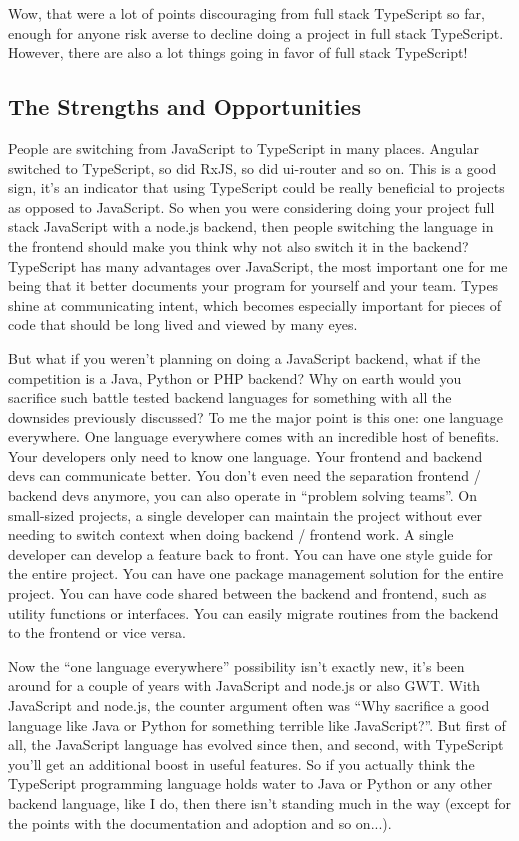 \documentclass[12pt,a4paper]{report}
\begin{document}
Wow, that were a lot of points discouraging from full stack TypeScript so far, enough for anyone risk averse to decline doing a project in full stack TypeScript. However, there are also a lot things going in favor of full stack TypeScript!

\subsection{The Strengths and Opportunities}
People are switching from JavaScript to TypeScript in many places. Angular switched to TypeScript, so did RxJS, so did ui-router and so on. This is a good sign, it's an indicator that using TypeScript could be really beneficial to projects as opposed to JavaScript. So when you were considering doing your project full stack JavaScript with a node.js backend, then people switching the language in the frontend should make you think why not also switch it in the backend? TypeScript has many advantages over JavaScript, the most important one for me being that it better documents your program for yourself and your team. Types shine at communicating intent, which becomes especially important for pieces of code that should be long lived and viewed by many eyes.

But what if you weren't planning on doing a JavaScript backend, what if the competition is a Java, Python or PHP backend? Why on earth would you sacrifice such battle tested backend languages for something with all the downsides previously discussed? To me the major point is this one: one language everywhere. One language everywhere comes with an incredible host of benefits. Your developers only need to know one language. Your frontend and backend devs can communicate better. You don't even need the separation frontend / backend devs anymore, you can also operate in ``problem solving teams''. On small-sized projects, a single developer can maintain the project without ever needing to switch context when doing backend / frontend work. A single developer can develop a feature back to front. You can have one style guide for the entire project. You can have one package management solution for the entire project. You can have code shared between the backend and frontend, such as utility functions or interfaces. You can easily migrate routines from the backend to the frontend or vice versa.

Now the ``one language everywhere'' possibility isn't exactly new, it's been around for a couple of years with JavaScript and node.js or also GWT. With JavaScript and node.js, the counter argument often was ``Why sacrifice a good language like Java or Python for something terrible like JavaScript?''. But first of all, the JavaScript language has evolved since then, and second, with TypeScript you'll get an additional boost in useful features. So if you actually think the TypeScript programming language holds water to Java or Python or any other backend language, like I do, then there isn't standing much in the way (except for the points with the documentation and adoption and so on...).
\end{document}
